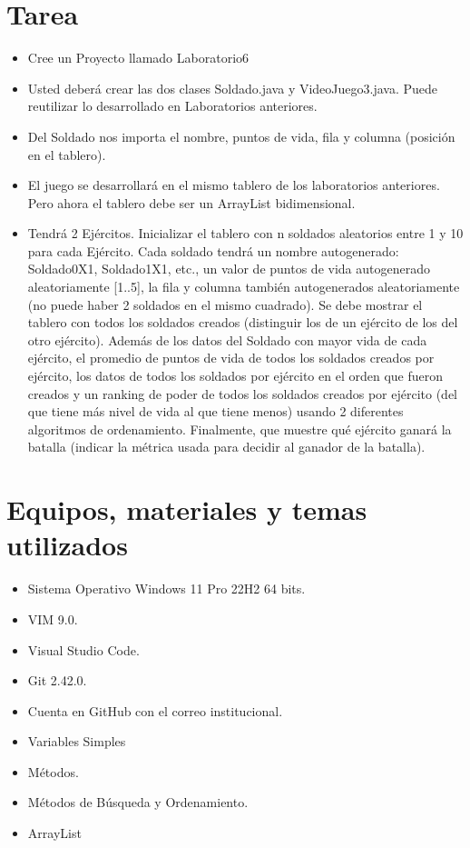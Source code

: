 \documentclass{article}
\begin{document}

	\section{Tarea}
	\begin{itemize}		
        \item Cree un Proyecto llamado Laboratorio6
        \item Usted deberá crear las dos clases Soldado.java y VideoJuego3.java. Puede reutilizar lo desarrollado en Laboratorios anteriores.
        \item Del Soldado nos importa el nombre, puntos de vida, fila y columna (posición en el tablero).
        \item El juego se desarrollará en el mismo tablero de los laboratorios anteriores. Pero ahora el tablero debe ser un ArrayList bidimensional.
        \item Tendrá 2 Ejércitos. Inicializar el tablero con n soldados aleatorios entre 1 y 10 para cada Ejército. Cada soldado tendrá un nombre autogenerado: Soldado0X1, Soldado1X1, etc., un valor de puntos de vida autogenerado aleatoriamente [1..5], la fila y columna también autogenerados aleatoriamente (no puede haber 2 soldados en el mismo cuadrado). Se debe mostrar el tablero con todos los soldados creados (distinguir los de un ejército de los del otro ejército). Además de los datos del Soldado con mayor vida de cada ejército, el promedio de puntos de vida de todos los soldados creados por ejército, los datos de todos los soldados por ejército en el orden que fueron creados y un ranking de poder de todos los soldados creados por ejército (del que tiene más nivel de vida al que tiene menos) usando 2 diferentes algoritmos de ordenamiento. Finalmente, que muestre qué ejército ganará la batalla (indicar la métrica usada para decidir al ganador de la batalla).

	\end{itemize}
		
	\section{Equipos, materiales y temas utilizados}
	\begin{itemize}
		\item Sistema Operativo Windows 11 Pro 22H2 64 bits.
		\item VIM 9.0.
		\item Visual Studio Code.
		\item Git 2.42.0.
		\item Cuenta en GitHub con el correo institucional.
        \item Variables Simples
        \item Métodos.
        \item Métodos de Búsqueda y Ordenamiento.
        \item ArrayList
        
	\end{itemize}
	
\end{document}
